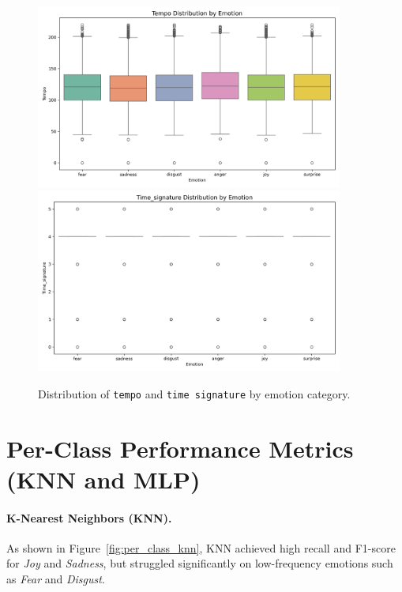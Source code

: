 \documentclass{article}
\begin{document}
\begin{figure}[H]
\centering
\includegraphics[width=0.9\textwidth]{Graphics/feature_by_emotion/tempo_by_emotion_boxplot.png}
\includegraphics[width=0.9\textwidth]{Graphics/feature_by_emotion/time_signature_by_emotion_boxplot.png}
\caption{Distribution of \texttt{tempo} and \texttt{time signature} by emotion category.}
\end{figure}

\newpage

\section{Per-Class Performance Metrics (KNN and MLP)}
\label{appendix:per_class_heatmaps}

\paragraph{K-Nearest Neighbors (KNN).}
As shown in Figure~\ref{fig:per_class_knn}, KNN achieved high recall and F1-score for \textit{Joy} and \textit{Sadness}, but struggled significantly on low-frequency emotions such as \textit{Fear} and \textit{Disgust}.
\end{document}
